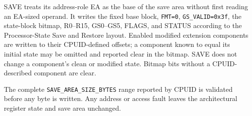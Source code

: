 SAVE treats its address-role EA as the base of the save area without first reading an EA-sized operand. It writes the fixed base block, \texttt{FMT=0}, \texttt{GS\_VALID=0x3f}, the state-block bitmap, R0--R15, GS0--GS5, FLAGS, and STATUS according to the Processor-State Save and Restore layout. Enabled modified extension components are written to their CPUID-defined offsets; a component known to equal its initial state may be omitted and reported clear in the bitmap. SAVE does not change a component's clean or modified state. Bitmap bits without a CPUID-described component are clear.

The complete \texttt{SAVE\_AREA\_SIZE\_BYTES} range reported by CPUID is validated before any byte is written. Any address or access fault leaves the architectural register state and save area unchanged.

